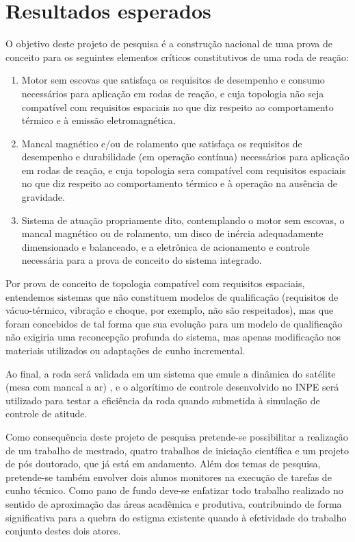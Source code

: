 \section{Resultados esperados} 
%

O objetivo deste projeto de pesquisa é a construção nacional de uma prova de conceito para os seguintes elementos críticos constitutivos de uma roda de reação:

\begin{enumerate}
	\item Motor sem escovas que satisfaça os requisitos de desempenho e consumo necessários para aplicação em rodas de reação, e cuja topologia não seja compatível com requisitos espaciais no que diz respeito ao comportamento térmico e à emissão eletromagnética.  
	
	\item Mancal magnético e/ou de rolamento que satisfaça os requisitos de desempenho e durabilidade (em operação contínua) necessários para aplicação em rodas de reação, e cuja topologia sera compatível com requisitos espaciais no que diz respeito ao comportamento térmico e à operação na ausência de gravidade.
	
	\item Sistema  de atuação propriamente dito, contemplando o motor sem escovas, o mancal magnético ou de rolamento, um disco de inércia adequadamente dimensionado e balanceado, e a eletrônica de acionamento e controle necessária para a prova de conceito do sistema integrado.
\end{enumerate}

Por prova de conceito de topologia compatível com requisitos espaciais, entendemos sistemas que não constituem modelos de qualificação (requisitos de vácuo-térmico, vibração e choque, por exemplo, não são respeitados), mas que foram concebidos de tal forma que sua evolução para um modelo de qualificação não exigiria uma reconcepção profunda do sistema, mas apenas modificação nos materiais utilizados ou adaptações de cunho incremental. 

Ao final, a roda será validada em um sistema que emule a dinâmica do satélite (mesa com mancal a ar) \cite{carrara2007controle}, e o algorítimo de controle desenvolvido no INPE será utilizado para testar a eficiência da roda quando submetida à simulação de controle de atitude.

Como consequência deste projeto de pesquisa pretende-se possibilitar a realização de um trabalho de mestrado, quatro trabalhos de iniciação científica e um projeto de pós doutorado, que já está em andamento. Além dos temas de pesquisa, pretende-se também envolver dois alunos monitores na execução de tarefas de cunho técnico. Como pano de fundo deve-se enfatizar todo trabalho realizado no sentido de aproximação das áreas acadêmica e produtiva, contribuindo de forma significativa para a quebra do estigma existente quando à efetividade do trabalho conjunto destes dois atores. 

